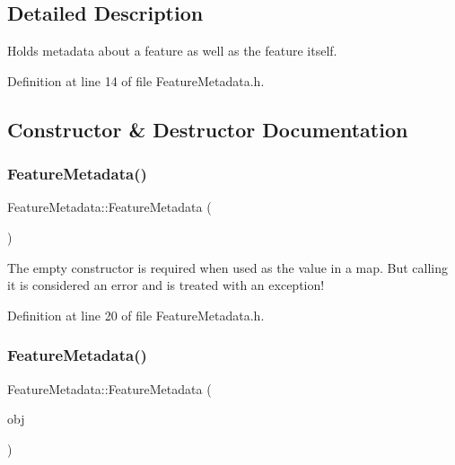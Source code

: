 \subsection{Detailed Description}
Holds metadata about a feature as well as the feature itself. 

Definition at line 14 of file Feature\+Metadata.\+h.



\subsection{Constructor \& Destructor Documentation}
\mbox{\label{class_feature_metadata_ab117cd690bb70fe8795422f976a251d7}} 
\subsubsection{\texorpdfstring{Feature\+Metadata()}{FeatureMetadata()}\hspace{0.1cm}{\footnotesize\ttfamily [1/3]}}
{\footnotesize\ttfamily Feature\+Metadata\+::\+Feature\+Metadata (\begin{DoxyParamCaption}{ }\end{DoxyParamCaption})\hspace{0.3cm}{\ttfamily [inline]}}

The empty constructor is required when used as the value in a map. But calling it is considered an error and is treated with an exception! 

Definition at line 20 of file Feature\+Metadata.\+h.

\mbox{\label{class_feature_metadata_ac94095ccb8ba325b552dd192c86bce09}} 
\subsubsection{\texorpdfstring{Feature\+Metadata()}{FeatureMetadata()}\hspace{0.1cm}{\footnotesize\ttfamily [2/3]}}
{\footnotesize\ttfamily Feature\+Metadata\+::\+Feature\+Metadata (\begin{DoxyParamCaption}\item[{const \hyperlink{class_feature_metadata}{Feature\+Metadata} \&}]{obj }\end{DoxyParamCaption})\hspace{0.3cm}{\ttfamily [inline]}}

